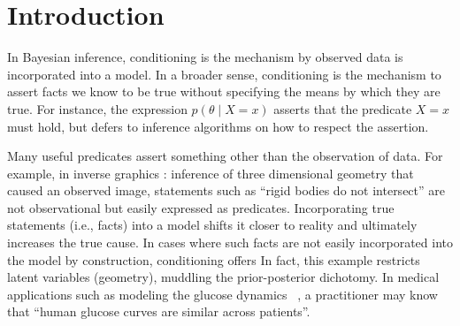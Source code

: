
\section{Introduction}


In Bayesian inference, conditioning is the mechanism by observed data is incorporated into a model.
In a broader sense, conditioning is the mechanism to assert facts we know to be true without specifying the means by which they are true.
For instance, the expression $p(\theta \mid X = x)$ asserts that the predicate $X = x$ must hold, but defers to inference algorithms on how to respect the assertion.

Many useful predicates assert something other than the observation of data.
For example, in inverse graphics \cite{}: inference of three dimensional geometry that caused an observed image,  statements such as ``rigid bodies do not intersect'' are not observational but easily expressed as predicates.
Incorporating true statements (i.e., facts) into a model shifts it closer to reality and ultimately increases the true cause.
In cases where such facts are not easily incorporated into the model by construction, conditioning offers  
In fact, this example restricts latent variables (geometry), muddling the prior-posterior dichotomy.
In medical applications such as modeling the glucose dynamics ~\citep{levine2017offline}, a practitioner may know that ``human glucose curves are similar across patients''.	


